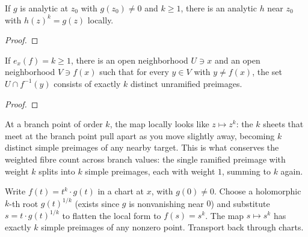 \begin{lemma}
\label{lem:analytic-kth-root}

If \(g\) is analytic at \(z_0\) with \(g(z_0)\ne 0\) and \(k\ge 1\),
there is an analytic \(h\) near \(z_0\) with \(h(z)^k=g(z)\) locally.
\leanok
\end{lemma}
\begin{proof}\leanok\end{proof}

\begin{lemma}
\label{lem:local-kfold-ramified}
If \(e_x(f)=k\ge 1\), there is an open neighborhood \(U\ni x\) and an
open neighborhood \(V\ni f(x)\) such that for every \(y\in V\) with
\(y\ne f(x)\), the set \(U\cap f^{-1}(y)\) consists of exactly \(k\)
distinct unramified preimages.
\leanok
\end{lemma}
\begin{proof}\leanok\end{proof}

\begin{layman}
At a branch point of order \(k\), the map locally looks like
\(z\mapsto z^k\): the \(k\) sheets that meet at the branch point pull
apart as you move slightly away, becoming \(k\) distinct simple
preimages of any nearby target. This is what conserves the weighted
fibre count across branch values: the single ramified preimage with
weight \(k\) splits into \(k\) simple preimages, each with weight
\(1\), summing to \(k\) again.
\end{layman}

\begin{proofsketch}
Write \(f(t)=t^k\cdot g(t)\) in a chart at \(x\), with \(g(0)\ne 0\).
Choose a holomorphic \(k\)-th root \(g(t)^{1/k}\) (exists since \(g\)
is nonvanishing near \(0\)) and substitute \(s=t\cdot g(t)^{1/k}\) to
flatten the local form to \(f(s)=s^k\). The map \(s\mapsto s^k\) has
exactly \(k\) simple preimages of any nonzero point. Transport back
through charts.
\end{proofsketch}

